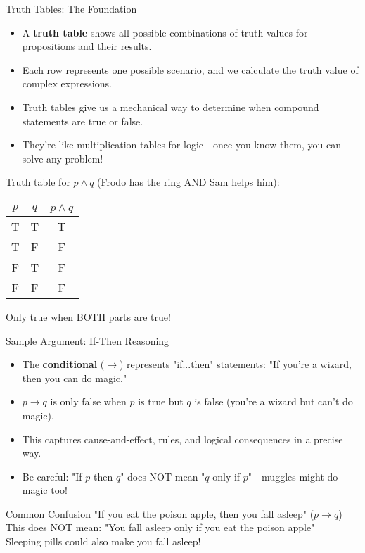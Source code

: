 \documentclass{beamer}
\begin{document}
	\begin{frame}{Truth Tables: The Foundation}
		\begin{itemize}
			\item A \textbf{truth table} shows all possible combinations of truth values for propositions and their results.
			\item Each row represents one possible scenario, and we calculate the truth value of complex expressions.
			\item Truth tables give us a mechanical way to determine when compound statements are true or false.
			\item They're like multiplication tables for logic—once you know them, you can solve any problem!
		\end{itemize}
		
		\begin{example}
			Truth table for $p \wedge q$ (Frodo has the ring AND Sam helps him):
			\begin{center}
				\begin{tabular}{|c|c|c|}
					\hline
					$p$ & $q$ & $p \wedge q$ \\
					\hline
					T & T & T \\
					T & F & F \\
					F & T & F \\
					F & F & F \\
					\hline
				\end{tabular}
			\end{center}
			Only true when BOTH parts are true!
		\end{example}
	\end{frame}
	
	\begin{frame}{Sample Argument: If-Then Reasoning}
		\begin{itemize}
			\item The \textbf{conditional} ($\rightarrow$) represents "if...then" statements: "If you're a wizard, then you can do magic."
			\item $p \rightarrow q$ is only false when $p$ is true but $q$ is false (you're a wizard but can't do magic).
			\item This captures cause-and-effect, rules, and logical consequences in a precise way.
			\item Be careful: "If $p$ then $q$" does NOT mean "$q$ only if $p$"—muggles might do magic too!
		\end{itemize}
		
		\begin{alertblock}{Common Confusion}
			"If you eat the poison apple, then you fall asleep" ($p \rightarrow q$)\\
			This does NOT mean: "You fall asleep only if you eat the poison apple"\\
			Sleeping pills could also make you fall asleep!
		\end{alertblock}
	\end{frame}
	
\end{document}
